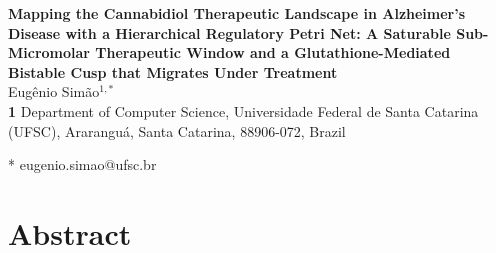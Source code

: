 \documentclass[10pt,letterpaper]{article}
\begin{document}
\vspace*{0.2in}

\begin{flushleft}
{\Large
\textbf{Mapping the Cannabidiol Therapeutic Landscape in Alzheimer's Disease with a Hierarchical Regulatory Petri Net: A Saturable Sub-Micromolar Therapeutic Window and a Glutathione-Mediated Bistable Cusp that Migrates Under Treatment}
}
\newline
\\
Eug\^enio Sim\~ao$^{1,*}$
\\
\bigskip
\textbf{1} Department of Computer Science, Universidade Federal de Santa Catarina (UFSC), Ararangu\'a, Santa Catarina, 88906-072, Brazil
\\
\bigskip

* eugenio.simao@ufsc.br

\end{flushleft}

\section*{Abstract}
\end{document}
